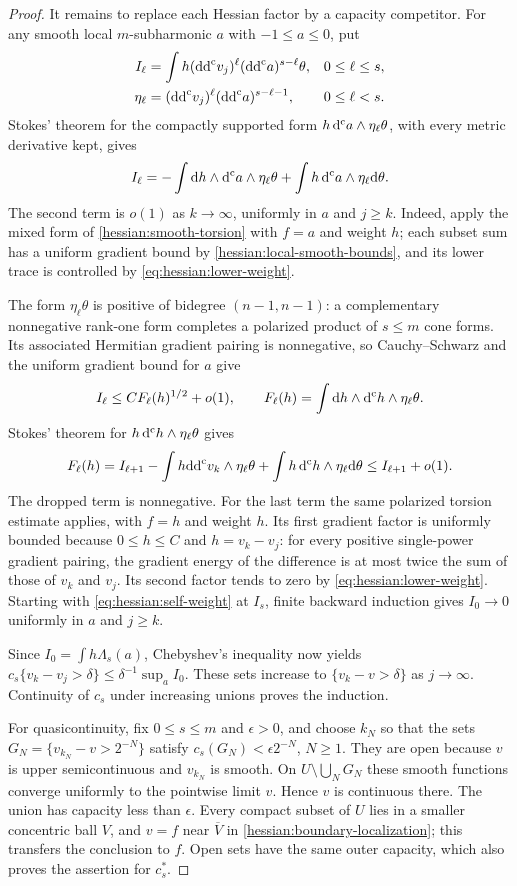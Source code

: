 \begin{proof}
It remains to replace each Hessian factor by a capacity competitor.
For any smooth local $m$-subharmonic $a$ with $-1\leq a\leq0$, put
\[
 \begin{aligned}
 I_\ell&=\int h(\mathrm{dd}^{\mathrm{c}} v_j)^\ell(\mathrm{dd}^{\mathrm{c}} a)^{s-\ell}\theta,
   &&0\leq\ell\leq s,\\
 \eta_\ell&=(\mathrm{dd}^{\mathrm{c}} v_j)^\ell(\mathrm{dd}^{\mathrm{c}} a)^{s-\ell-1},
   &&0\leq\ell<s.
 \end{aligned}
\]
Stokes' theorem for the compactly supported form
$h\,\mathrm d^{\mathrm c} a\wedge\eta_\ell\theta$, with every metric derivative
kept, gives
\[
 I_\ell=-\int\mathrm dh\wedge\mathrm d^{\mathrm c} a\wedge\eta_\ell\theta
          +\int h\,\mathrm d^{\mathrm c} a\wedge\eta_\ell\mathrm d\theta.
\]
The second term is $o(1)$ as $k\to\infty$, uniformly in $a$ and
$j\geq k$. Indeed, apply the mixed form of
\cref{hessian:smooth-torsion} with $f=a$ and weight $h$; each subset
sum has a uniform gradient bound by \cref{hessian:local-smooth-bounds},
and its lower trace is controlled by \eqref{eq:hessian:lower-weight}.

The form $\eta_\ell\theta$ is positive of bidegree $(n-1,n-1)$:
a complementary nonnegative rank-one form completes a polarized
product of $s\leq m$ cone forms. Its associated Hermitian
gradient pairing is nonnegative, so Cauchy--Schwarz and the uniform
gradient bound for $a$ give
\[
 I_\ell\leq C F_\ell(h)^{1/2}+o(1),
 \qquad F_\ell(h)=\int\mathrm dh\wedge\mathrm d^{\mathrm c} h\wedge\eta_\ell\theta.
\]
Stokes' theorem for $h\,\mathrm d^{\mathrm c} h\wedge\eta_\ell\theta$ gives
\[
 F_\ell(h)= I_{\ell+1}
       -\int h\mathrm{dd}^{\mathrm{c}} v_k\wedge\eta_\ell\theta
       +\int h\,\mathrm d^{\mathrm c} h\wedge\eta_\ell\mathrm d\theta
                    \leq I_{\ell+1}+o(1).
\]
The dropped term is nonnegative. For the last term the same
polarized torsion estimate applies, with $f=h$ and weight $h$. Its
first gradient factor is uniformly bounded because $0\leq h\leq C$
and $h=v_k-v_j$: for every positive single-power gradient pairing,
the gradient energy of the difference is at most twice the sum of
those of $v_k$ and $v_j$. Its second factor tends to zero by
\eqref{eq:hessian:lower-weight}.
Starting with \eqref{eq:hessian:self-weight} at $I_s$, finite
backward induction gives $I_0\to0$ uniformly in $a$ and $j\geq k$.

Since $I_0=\int h\Lambda_s(a)$, Chebyshev's inequality now yields
$c_s\{v_k-v_j>\delta\}\leq\delta^{-1}\sup_a I_0$.
These sets increase to $\{v_k-v>\delta\}$ as $j\to\infty$.
Continuity of $c_s$ under increasing unions proves the induction.

For quasicontinuity, fix $0\leq s\leq m$ and $\epsilon>0$, and
choose $k_N$ so that the sets
$G_N=\{v_{k_N}-v>2^{-N}\}$ satisfy
$c_s(G_N)<\epsilon2^{-N}$, $N\geq1$.
They are open because $v$ is upper semicontinuous and $v_{k_N}$
is smooth. On $U\setminus\bigcup_NG_N$ these smooth functions
converge uniformly to the pointwise limit $v$. Hence $v$ is
continuous there. The union has capacity less than $\epsilon$.
Every compact subset of $U$ lies in a smaller concentric ball $V$,
and $v=f$ near $\overline V$ in \cref{hessian:boundary-localization};
this transfers the conclusion to $f$. Open sets have the same outer
capacity, which also proves the assertion for $c_s^*$.
\end{proof}


